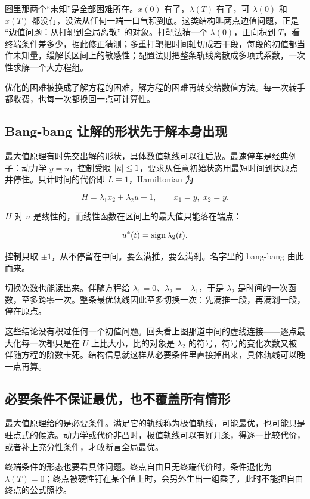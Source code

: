 图里那两个``未知''是全部困难所在。\(x(0)\) 有了，\(\lambda(T)\) 有了，可 \(\lambda(0)\) 和 \(x(T)\) 都没有，没法从任何一端一口气积到底。这类结构叫两点边值问题，正是 \hyperref[sec:08-Numerical-Analysis/06-ODE/04]{``边值问题：从打靶到全局离散''} 的对象。打靶法猜一个 \(\lambda(0)\)，正向积到 \(T\)，看终端条件差多少，据此修正猜测；多重打靶把时间轴切成若干段，每段的初值都当作未知量，缓解长区间上的敏感性；配置法则把整条轨线离散成多项式系数，一次性求解一个大方程组。

优化的困难被换成了解方程的困难，解方程的困难再转交给数值方法。每一次转手都收费，也每一次都换回一点可计算性。

\subsection{Bang-bang 让解的形状先于解本身出现}

最大值原理有时先交出解的形状，具体数值轨线可以往后放。最速停车是经典例子：动力学 \(\ddot y = u\)，控制受限 \(\left|u\right|\le 1\)，要求从任意初始状态用最短时间到达原点并停住。只计时间的代价即 \(L\equiv 1\)，Hamiltonian 为

\[
H = \lambda_1 x_2 + \lambda_2 u - 1, \qquad x_1 = y,\; x_2 = \dot y .
\]

\(H\) 对 \(u\) 是线性的，而线性函数在区间上的最大值只能落在端点：

\[
u^*(t) = \operatorname{sign}\lambda_2(t).
\]

控制只取 \(\pm 1\)，从不停留在中间。要么满推，要么满刹。名字里的 bang-bang 由此而来。

切换次数也能读出来。伴随方程给 \(\dot\lambda_1 = 0\)、\(\dot\lambda_2 = -\lambda_1\)，于是 \(\lambda_2\) 是时间的一次函数，至多跨零一次。整条最优轨线因此至多切换一次：先满推一段，再满刹一段，停在原点。

这些结论没有积过任何一个初值问题。回头看上图那道中间的虚线连接——逐点最大化每一次都只是在 \(U\) 上比大小，比的对象是 \(\lambda_2\) 的符号，符号的变化次数又被伴随方程的阶数卡死。结构信息就这样从必要条件里直接掉出来，具体轨线可以晚一点再算。

\subsection{必要条件不保证最优，也不覆盖所有情形}

最大值原理给的是必要条件。满足它的轨线称为极值轨线，可能最优，也可能只是驻点式的候选。动力学或代价非凸时，极值轨线可以有好几条，得逐一比较代价，或者补上充分性条件，才敢断言全局最优。

终端条件的形态也要看具体问题。终点自由且无终端代价时，条件退化为 \(\lambda(T)=0\)；终点被硬性钉在某个值上时，会另外生出一组乘子，此时不能把自由终点的公式照抄。

